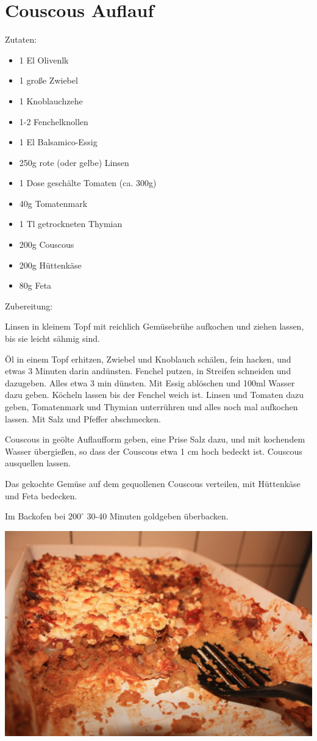 \section{Couscous Auflauf}
Zutaten:
\begin{itemize}
    \item 1 El Olivenlk
    \item 1 große Zwiebel
    \item 1 Knoblauchzehe
    \item 1-2 Fenchelknollen
    \item 1 El Balsamico-Essig
    \item 250g rote (oder gelbe) Linsen
    \item 1 Dose geschälte Tomaten (ca. 300g)
    \item 40g Tomatenmark
    \item 1 Tl getrockneten Thymian
    \item 200g Couscous
    \item 200g Hüttenkäse
    \item 80g Feta
\end{itemize}

\noindent Zubereitung:

\noindent Linsen in kleinem Topf mit reichlich Gemüsebrühe aufkochen und ziehen
lassen, bis sie leicht sähmig sind.

Öl in einem Topf erhitzen, Zwiebel und Knoblauch schälen, fein hacken, und
etwas 3 Minuten darin andünsten. Fenchel putzen, in Streifen schneiden und
dazugeben. Alles etwa 3 min dünsten. Mit Essig ablöschen und 100ml Wasser dazu
geben. Köcheln lassen bis der Fenchel weich ist. Linsen und Tomaten dazu geben,
Tomatenmark und Thymian unterrühren und alles noch mal aufkochen lassen. Mit
Salz und Pfeffer abschmecken.

Couscous in geölte Auflaufform geben, eine Prise Salz dazu, und mit kochendem
Wasser übergießen, so dass der Couscous etwa 1 cm hoch bedeckt ist. Couscous
ausquellen lassen.

Das gekochte Gemüse auf dem gequollenen Couscous verteilen, mit Hüttenkäse und
Feta bedecken.

Im Backofen bei $200^\circ$ 30-40 Minuten goldgeben überbacken.
\mbox{}
\vfill
\begin{center}
    \includegraphics[width=\textwidth]{Couscous-Auflauf/IMG_6094._small.jpg}
\end{center}
\vfill
\mbox{ }
\newpage

